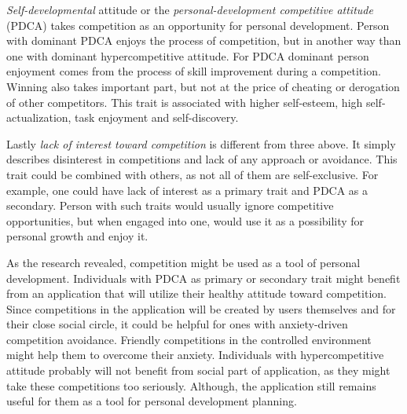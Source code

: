 \textit{Self-developmental} attitude or the \textit{personal-development competitive attitude} (PDCA)
takes competition as an opportunity for personal development.
Person with dominant PDCA enjoys the process of competition, but in another way than one with dominant hypercompetitive
attitude.
For PDCA dominant person enjoyment comes from the process of skill improvement during a competition.
Winning also takes important part, but not at the price of cheating or derogation of other competitors.
This trait is associated with higher self-esteem, high self-actualization, task enjoyment and self-discovery.\cite{cit-ryckman-pdca}

Lastly \textit{lack of interest toward competition} is different from three above.
It simply describes disinterest in competitions and lack of any approach or avoidance.
This trait could be combined with others, as not all of them are self-exclusive.
For example, one could have lack of interest as a primary trait and PDCA as a secondary.
Person with such traits would usually ignore competitive opportunities, but when engaged into one,
would use it as a possibility for personal growth and enjoy it.\cite{the-four-faces-of-competetition}

As the research revealed, competition might be used as a tool of personal development.
Individuals with PDCA as primary or secondary trait might benefit from an application that will utilize their healthy
attitude toward competition.
Since competitions in the application will be created by users themselves and for their close social circle,
it could be helpful for ones with anxiety-driven competition avoidance.
Friendly competitions in the controlled environment might help them to overcome their anxiety.
Individuals with hypercompetitive attitude probably will not benefit from social part of application,
as they might take these competitions too seriously.
Although, the application still remains useful for them as a tool for personal development planning.
